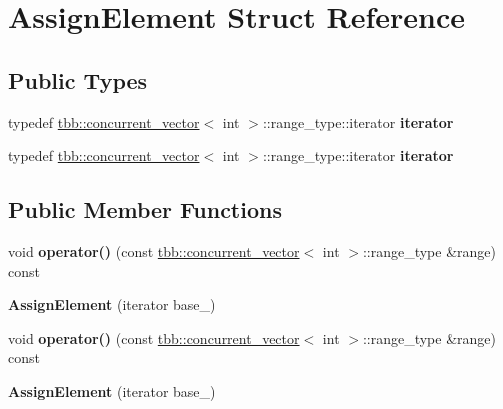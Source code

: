 \hypertarget{structAssignElement}{}\section{Assign\+Element Struct Reference}
\label{structAssignElement}
\subsection*{Public Types}
\begin{DoxyCompactItemize}
\item 
\hypertarget{structAssignElement_aeeb48d31d2a0f07568f99d7f98d097e3}{}typedef \hyperlink{classtbb_1_1concurrent__vector}{tbb\+::concurrent\+\_\+vector}$<$ int $>$\+::range\+\_\+type\+::iterator {\bfseries iterator}\label{structAssignElement_aeeb48d31d2a0f07568f99d7f98d097e3}

\item 
\hypertarget{structAssignElement_aeeb48d31d2a0f07568f99d7f98d097e3}{}typedef \hyperlink{classtbb_1_1concurrent__vector}{tbb\+::concurrent\+\_\+vector}$<$ int $>$\+::range\+\_\+type\+::iterator {\bfseries iterator}\label{structAssignElement_aeeb48d31d2a0f07568f99d7f98d097e3}

\end{DoxyCompactItemize}
\subsection*{Public Member Functions}
\begin{DoxyCompactItemize}
\item 
\hypertarget{structAssignElement_a6d1637d739ea6da563145fcfbefb1058}{}void {\bfseries operator()} (const \hyperlink{classtbb_1_1concurrent__vector}{tbb\+::concurrent\+\_\+vector}$<$ int $>$\+::range\+\_\+type \&range) const \label{structAssignElement_a6d1637d739ea6da563145fcfbefb1058}

\item 
\hypertarget{structAssignElement_ac029a0322a0491ab30099579a190b264}{}{\bfseries Assign\+Element} (iterator base\+\_\+)\label{structAssignElement_ac029a0322a0491ab30099579a190b264}

\item 
\hypertarget{structAssignElement_a6d1637d739ea6da563145fcfbefb1058}{}void {\bfseries operator()} (const \hyperlink{classtbb_1_1concurrent__vector}{tbb\+::concurrent\+\_\+vector}$<$ int $>$\+::range\+\_\+type \&range) const \label{structAssignElement_a6d1637d739ea6da563145fcfbefb1058}

\item 
\hypertarget{structAssignElement_ac029a0322a0491ab30099579a190b264}{}{\bfseries Assign\+Element} (iterator base\+\_\+)\label{structAssignElement_ac029a0322a0491ab30099579a190b264}

\end{DoxyCompactItemize}
